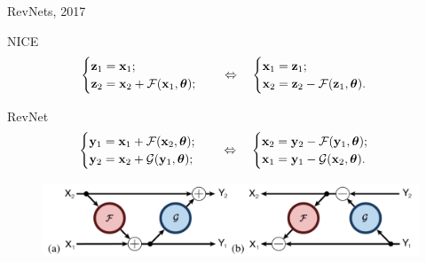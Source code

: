 \documentclass{beamer}
\begin{document}
\begin{frame}{RevNets, 2017}
	\begin{block}{NICE}
		\vspace{-0.2cm}
		\begin{equation*}
			\begin{cases} \mathbf{z}_1 = \mathbf{x}_1; \\ \mathbf{z}_2 = \mathbf{x}_2 + \mathcal{F}(\mathbf{x}_1, \boldsymbol{\theta});\end{cases}  \quad \Leftrightarrow \quad 
			\begin{cases} \mathbf{x}_1 = \mathbf{z}_1; \\ \mathbf{x}_2 = \mathbf{z}_2 - \mathcal{F}(\mathbf{z}_1, \boldsymbol{\theta}).\end{cases} 
		\end{equation*}
		\vspace{-0.2cm}
	\end{block}
	\begin{block}{RevNet}
		\begin{equation*}
			\begin{cases} \mathbf{y}_1 = \mathbf{x}_1 + \mathcal{F}(\mathbf{x}_2, \boldsymbol{\theta}); \\ \mathbf{y}_2 = \mathbf{x}_2 + \mathcal{G}(\mathbf{y}_1, \boldsymbol{\theta});\end{cases} \quad \Leftrightarrow \quad 
			\begin{cases} \mathbf{x}_2 = \mathbf{y}_2 - \mathcal{F}(\mathbf{y}_1, \boldsymbol{\theta}); \\ \mathbf{x}_1 = \mathbf{y}_1 - \mathcal{G}(\mathbf{x}_2, \boldsymbol{\theta}).\end{cases} 
		\end{equation*}
	\end{block}
	\begin{figure}
		\centering
		\includegraphics[width=\linewidth]{figs/revnet.png}
	\end{figure}
\end{frame}
\end{document}
